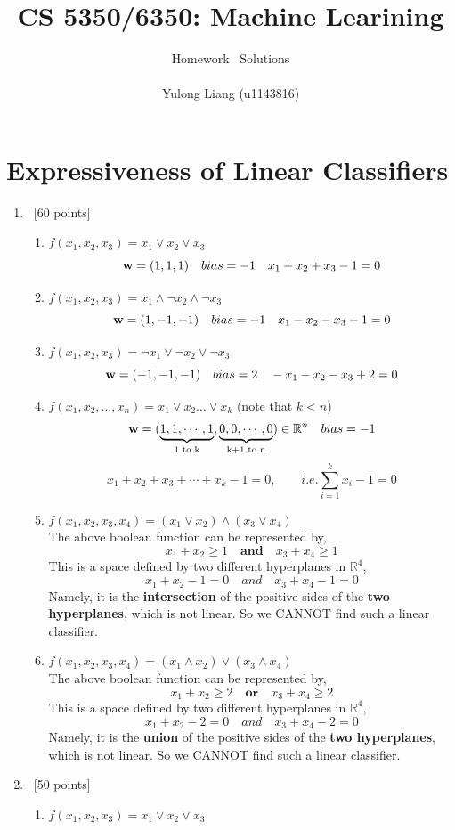 \documentclass[12pt, fullpage,letterpaper]{article}
\title{CS 5350/6350: Machine Learining \semester}
\author{Homework \assignmentId\ Solutions\\\\Yulong Liang (u1143816)}
\newcommand{\bw}{{\bf w}}
\begin{document}
\maketitle

\section{Expressiveness of Linear Classifiers}
\begin{enumerate}
\item~[60 points] 
\begin{enumerate}
\item $f(x_1, x_2, x_3) = x_1 \lor x_2 \lor x_3$
$$\bw=(1,1,1) \quad bias=-1 \quad x_1+x_2+x_3-1=0$$
\item $f(x_1, x_2, x_3) = x_1 \land \neg x_2 \land \neg x_3$
$$\bw=(1,-1,-1) \quad bias=-1 \quad x_1-x_2-x_3-1=0$$
\item $f(x_1, x_2, x_3) = \neg x_1 \lor \neg x_2 \lor \neg x_3$
$$\bw=(-1,-1,-1) \quad bias=2 \quad -x_1-x_2-x_3+2=0$$
\item $f(x_1, x_2, \ldots, x_n) = x_1 \lor x_2 \ldots \lor x_k$ (note that  $k <n$)
$$\bw=(\underbrace{1,1,\cdots,1}_\text{1 to k},\underbrace{0,0,\cdots,0}_\text{k+1 to n})\in \mathbb{R}^n \quad bias=-1$$
$$x_1+x_2+x_3+\cdots+x_k-1=0,\qquad i.e. \sum_{i=1}^kx_i-1=0$$
\item $f(x_1, x_2, x_3, x_4) = (x_1 \lor x_2) \land (x_3 \lor x_4)$\\
The above boolean function can be represented by, 
$$x_1+x_2\ge1\quad\mathbf{and}\quad x_3+x_4\ge1$$
This is a space defined by two different hyperplanes in $\mathbb{R}^4$,
$$x_1+x_2-1=0\quad and \quad x_3+x_4-1=0$$
Namely, it is the \textbf{intersection} of the positive sides of the \textbf{two hyperplanes}, which is not linear. So we CANNOT find such a linear classifier.
\item $f(x_1, x_2, x_3, x_4) = (x_1 \land x_2) \lor (x_3 \land x_4)$\\
The above boolean function can be represented by, 
$$x_1+x_2\ge2\quad\mathbf{or}\quad x_3+x_4\ge2$$
This is a space defined by two different hyperplanes in $\mathbb{R}^4$,
$$x_1+x_2-2=0\quad and \quad x_3+x_4-2=0$$
Namely, it is the \textbf{union} of the positive sides of the \textbf{two hyperplanes}, which is not linear. So we CANNOT find such a linear classifier.
\end{enumerate}
\item~[50 points]
\begin{enumerate}
\item $f(x_1, x_2, x_3) = x_1 \lor x_2 \lor x_3$

\end{enumerate}
\end{enumerate}
\end{document}
